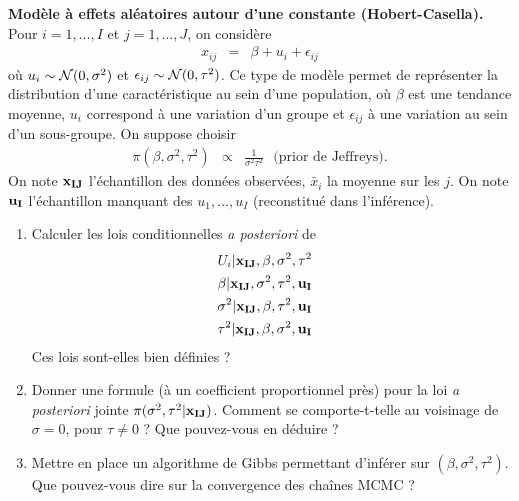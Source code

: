 \begin{exec}{\bf Modèle à effets aléatoires autour d'une constante  (Hobert-Casella).}
Pour $i=1,\ldots,I$ et $j=1,\ldots,J$, on considère 
\begin{eqnarray*}
x_{ij} &  = & \beta + u_i + \epsilon_{ij}
\end{eqnarray*}
où $u_i\sim {\cal{N}}(0,\sigma^2)$ et $\epsilon_{ij}\sim {\cal{N}}(0,\tau^2)$. Ce type de modèle permet de représenter la distribution d'une caractéristique au sein d'une population, où  $\beta$ est une tendance moyenne, $u_i$ correspond à une  variation d'un groupe et $\epsilon_{ij}$ à une  variation au sein d'un sous-groupe. On suppose choisir 
\begin{eqnarray*}
\pi(\beta,\sigma^2,\tau^2) & \propto & \frac{1}{\sigma^2\tau^2} \ \ \ \text{(prior de Jeffreys)}.
\end{eqnarray*}
On note ${\bf x_{IJ}}$ l'échantillon des données observées, $\bar{x}_i$ la moyenne sur les $j$. On note ${\bf u_I}$ l'échantillon manquant des $u_1,\ldots,u_I$ (reconstitué dans l'inférence). 
\begin{enumerate}
    \item Calculer les lois conditionnelles {\it a posteriori} de 
\begin{eqnarray*}
U_i|{\bf x_{IJ}},\beta,\sigma^2,\tau^2 &  &  \\
\beta|{\bf x_{IJ}},\sigma^2,\tau^2,{\bf u_I} &  &  \\
\sigma^2|{\bf x_{IJ}},\beta,\tau^2,{\bf u_I} &  &  \\
\tau^2|{\bf x_{IJ}},\beta,\sigma^2,{\bf u_I} & & 
\end{eqnarray*}
Ces lois sont-elles bien définies ?
\item Donner une formule (à un coefficient proportionnel près) pour la loi {\it a posteriori} jointe $\pi(\sigma^2,\tau^2|{\bf x_{IJ}})$. Comment se comporte-t-telle au voisinage de $\sigma=0$, pour $\tau\neq 0$ ? Que pouvez-vous en déduire ? 
\item Mettre en place un algorithme de Gibbs permettant d'inférer sur $(\beta,\sigma^2,\tau^2)$. 
Que pouvez-vous dire sur la convergence des chaînes MCMC ?
\end{enumerate}
\end{exec}

\if{} \vspace{1cm} 
\fi
\vspace{0.5cm}

\clearpage

